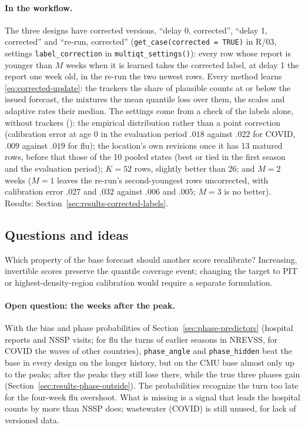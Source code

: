\documentclass[11pt,a4paper]{article}
\theoremstyle{definition}
\theoremstyle{remark}
\begin{document}
\paragraph{In the workflow.} The three designs have corrected versions,
``delay 0, corrected'', ``delay 1, corrected'' and ``re-run, corrected''
(\texttt{get\_case(corrected = TRUE)} in R/03, settings
\texttt{label\_correction} in \texttt{multiqt\_settings()}): every row whose
report is younger than $M$ weeks when it is learned takes the corrected
label, at delay 1 the report one week old, in the re-run the two newest
rows. Every method learns
\eqref{eq:corrected-update}: the trackers the share of plausible counts at or
below the issued forecast, the mixtures the mean quantile loss over them, the
scales and adaptive rates their median. The settings come from a check of the
labels alone, without trackers
(): the empirical
distribution rather than a point correction (calibration error at age 0 in the
evaluation period $.018$ against $.022$ for COVID, $.009$ against $.019$ for
flu); the location's own revisions once it has 13 matured rows, before that
those of the 10 pooled states (best or tied in the first season and the
evaluation period); $K=52$ rows, slightly better than 26; and $M=2$ weeks ($M=1$ leaves
the re-run's second-youngest rows uncorrected, with calibration error $.027$
and $.032$ against $.006$ and $.005$; $M=3$ is no better). Results:
Section~\ref{sec:results-corrected-labels}.

\subsection{Questions and ideas}
\label{sec:open-issues}
Which property of the base forecast should another score recalibrate?
Increasing, invertible scores preserve the quantile coverage event;
changing the target to PIT or highest-density-region calibration would
require a separate formulation.

\paragraph{Open question: the weeks after the peak.} With the bias and
phase probabilities of Section~\ref{sec:phase-predictors} (hospital reports
and NSSP visits; for flu the turns of earlier seasons in NREVSS, for COVID
the waves of other countries), \texttt{phase\_angle} and \texttt{phase\_hidden}
beat the base in every design on the longer history, but on the CMU base
almost only up to the peaks; after the peaks they still lose there, while
the true three phases gain (Section~\ref{sec:results-phase-outside}). The
probabilities recognize the turn too late for the four-week flu overshoot.
What is missing is a signal that leads the hospital counts by more than
NSSP does; wastewater (COVID) is still unused, for lack of versioned data.
\end{document}
